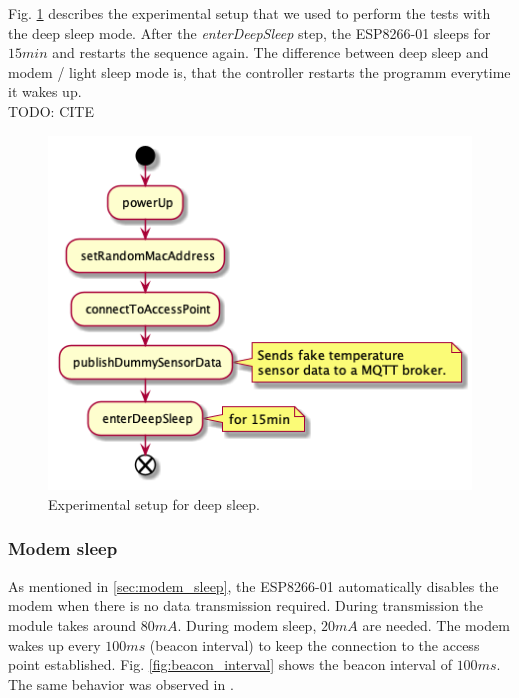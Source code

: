 Fig. \ref{fig:experiment_deep_sleep} describes the experimental setup that we used to perform the tests with the deep sleep mode.
After the \textit{enterDeepSleep} step, the ESP8266-01 sleeps for $15min$ and restarts the sequence again.
The difference between deep sleep and modem / light sleep mode is, that the controller restarts the programm everytime it wakes up.\\
TODO: CITE\\
\begin{figure}[h]
    \centering
    \includegraphics[width = 0.7 \linewidth]{fig/sequence_deep_sleep.png}
    \caption{Experimental setup for deep sleep.}
    \label{fig:experiment_deep_sleep}
\end{figure}

\subsubsection{Modem sleep}
As mentioned in \ref{sec:modem_sleep}, the ESP8266-01 automatically disables the modem when there is no data transmission required.
During transmission the module takes around $80mA$. During modem sleep, $20mA$ are needed.
The modem wakes up every $100ms$ (beacon interval) to keep the connection to the access point established.
Fig. \ref{fig:beacon_interval} shows the beacon interval of $100ms$. 
The same behavior was observed in \cite{montori_is_2017}.

